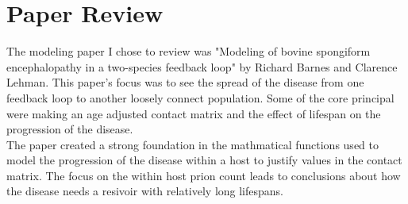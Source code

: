 \documentclass{report}
\begin{document}
\section{Paper Review}
The modeling paper I chose to review was "Modeling of bovine spongiform encephalopathy in a two-species feedback loop" by Richard Barnes and Clarence Lehman. This paper's focus was to see  the spread of the disease from one feedback loop to another loosely connect population. Some of the core principal were making an age  adjusted contact matrix and the effect of lifespan on the progression of the disease.\\
The paper created a strong foundation in the mathmatical functions used to model the progression of the disease within a host to justify values in the contact matrix. The focus on the within host prion count leads to conclusions about how the disease needs a resivoir with relatively long lifespans.
\end{document}
